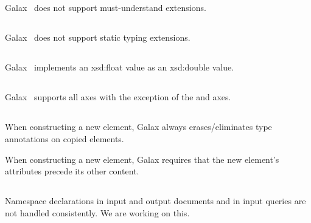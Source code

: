 \subsection*{}

   Galax \version\ does not support must-understand extensions.

\subsection*{}

   Galax \version\ does not support static typing extensions.

\subsection*{}

   Galax \version\ implements an xsd:float value as an xsd:double value.

\subsection*{}

   Galax \version\ supports all axes with the exception of the
    and  axes.

\subsection*{}

When constructing a new element, Galax \version always
erases/eliminates type annotations on copied elements. 

When constructing a new element, Galax \version requires that 
the new element's attributes precede its other content. 

\subsection*{}

Namespace declarations in input and output documents and in input
queries are not handled consistently. 
We are working on
this.

